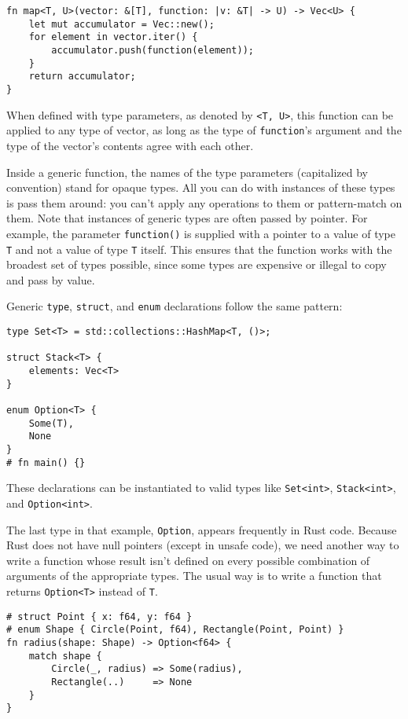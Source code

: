\documentclass[]{article}
\begin{document}
\begin{verbatim}
fn map<T, U>(vector: &[T], function: |v: &T| -> U) -> Vec<U> {
    let mut accumulator = Vec::new();
    for element in vector.iter() {
        accumulator.push(function(element));
    }
    return accumulator;
}
\end{verbatim}

When defined with type parameters, as denoted by
\texttt{\textless{}T, U\textgreater{}}, this function can be applied to
any type of vector, as long as the type of \texttt{function}'s argument
and the type of the vector's contents agree with each other.

Inside a generic function, the names of the type parameters (capitalized
by convention) stand for opaque types. All you can do with instances of
these types is pass them around: you can't apply any operations to them
or pattern-match on them. Note that instances of generic types are often
passed by pointer. For example, the parameter \texttt{function()} is
supplied with a pointer to a value of type \texttt{T} and not a value of
type \texttt{T} itself. This ensures that the function works with the
broadest set of types possible, since some types are expensive or
illegal to copy and pass by value.

Generic \texttt{type}, \texttt{struct}, and \texttt{enum} declarations
follow the same pattern:

\begin{verbatim}
type Set<T> = std::collections::HashMap<T, ()>;

struct Stack<T> {
    elements: Vec<T>
}

enum Option<T> {
    Some(T),
    None
}
# fn main() {}
\end{verbatim}

These declarations can be instantiated to valid types like
\texttt{Set\textless{}int\textgreater{}},
\texttt{Stack\textless{}int\textgreater{}}, and
\texttt{Option\textless{}int\textgreater{}}.

The last type in that example, \texttt{Option}, appears frequently in
Rust code. Because Rust does not have null pointers (except in unsafe
code), we need another way to write a function whose result isn't
defined on every possible combination of arguments of the appropriate
types. The usual way is to write a function that returns
\texttt{Option\textless{}T\textgreater{}} instead of \texttt{T}.

\begin{verbatim}
# struct Point { x: f64, y: f64 }
# enum Shape { Circle(Point, f64), Rectangle(Point, Point) }
fn radius(shape: Shape) -> Option<f64> {
    match shape {
        Circle(_, radius) => Some(radius),
        Rectangle(..)     => None
    }
}
\end{verbatim}
\end{document}
